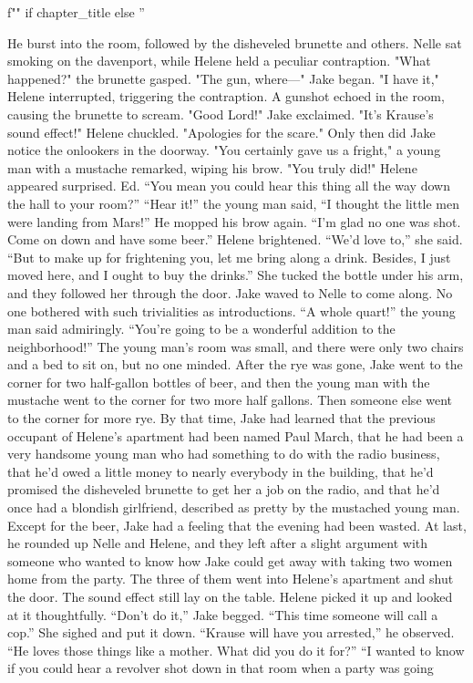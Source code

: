 \documentclass{novel}
\begin{document}
\begin{ChapterStart}
\vspace{3\nbs}
f"" if chapter_title else ''
\end{ChapterStart}

He burst into the room, followed by the disheveled brunette and others. Nelle sat smoking on the davenport, while Helene held a peculiar contraption. "What happened?" the brunette gasped. "The gun, where—" Jake began. "I have it," Helene interrupted, triggering the contraption. A gunshot echoed in the room, causing the brunette to scream. "Good Lord!" Jake exclaimed. "It's Krause's sound effect!" Helene chuckled. "Apologies for the scare." Only then did Jake notice the onlookers in the doorway. "You certainly gave us a fright," a young man with a mustache remarked, wiping his brow. "You truly did!" Helene appeared surprised. Ed. “You mean you could hear this thing all the way down the hall to your room?” “Hear it!” the young man said, “I thought the little men were landing from Mars!” He mopped his brow again. “I’m glad no one was shot. Come on down and have some beer.” Helene brightened. “We’d love to,” she said. “But to make up for frightening you, let me bring along a drink. Besides, I just moved here, and I ought to buy the drinks.” She tucked the bottle under his arm, and they followed her through the door. Jake waved to Nelle to come along. No one bothered with such trivialities as introductions. “A whole quart!” the young man said admiringly. “You’re going to be a wonderful addition to the neighborhood!” The young man’s room was small, and there were only two chairs and a bed to sit on, but no one minded. After the rye was gone, Jake went to the corner for two half-gallon bottles of beer, and then the young man with the mustache went to the corner for two more half gallons. Then someone else went to the corner for more rye. By that time, Jake had learned that the previous occupant of Helene’s apartment had been named Paul March, that he had been a very handsome young man who had something to do with the radio business, that he’d owed a little money to nearly everybody in the building, that he’d promised the disheveled brunette to get her a job on the radio, and that he’d once had a blondish girlfriend, described as pretty by the mustached young man. Except for the beer, Jake had a feeling that the evening had been wasted. At last, he rounded up Nelle and Helene, and they left after a slight argument with someone who wanted to know how Jake could get away with taking two women home from the party. The three of them went into Helene’s apartment and shut the door. The sound effect still lay on the table. Helene picked it up and looked at it thoughtfully. “Don’t do it,” Jake begged. “This time someone will call a cop.” She sighed and put it down. “Krause will have you arrested,” he observed. “He loves those things like a mother. What did you do it for?” “I wanted to know if you could hear a revolver shot down in that room when a party was going 
\end{document}
